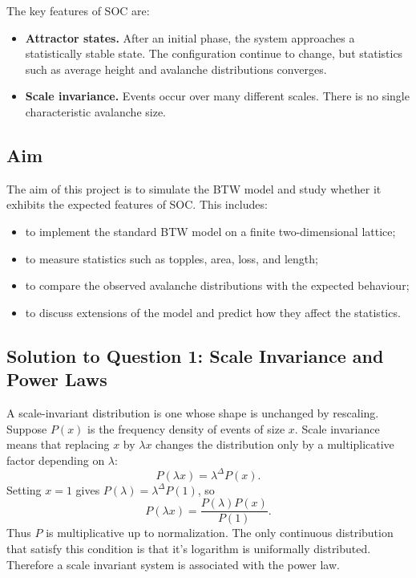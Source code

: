 \documentclass[11pt]{article}
\begin{document}
The key features of SOC are:

\begin{itemize}
    \item \textbf{Attractor states.} After an initial phase, the system approaches a statistically stable state. 
    The configuration continue to change, but statistics such as average height and avalanche distributions converges.

    \item \textbf{Scale invariance.} Events occur over many different scales. 
    There is no single characteristic avalanche size.

\end{itemize}

\subsection{Aim}

The aim of this project is to simulate the BTW model and study whether it exhibits the expected features of SOC. 
This includes:

\begin{itemize}
    \item to implement the standard BTW model on a finite two-dimensional lattice;
    \item to measure statistics such as topples, area, loss, and length;
    \item to compare the observed avalanche distributions with the expected behaviour;
    \item to discuss extensions of the model and predict how they affect the statistics.
\end{itemize}

\subsection{Solution to Question 1: Scale Invariance and Power Laws}

A scale-invariant distribution is one whose shape is unchanged by rescaling. 
Suppose \(P(x)\) is the frequency density of events of size \(x\). 
Scale invariance means that replacing \(x\) by \(\lambda x\) changes the distribution only by a multiplicative factor depending on \(\lambda\):
\[
    P(\lambda x) = \lambda^{\Delta}P(x).
\]
Setting \(x=1\) gives \(P(\lambda)=\lambda^{\Delta}P(1)\), so
\[
    P(\lambda x)=\frac{P(\lambda)P(x)}{P(1)}.
\]
Thus \(P\) is multiplicative up to normalization. The only continuous distribution that satisfy this condition is 
that it's logarithm is uniformally distributed.
Therefore a scale invariant system is associated with the power law.
\end{document}
